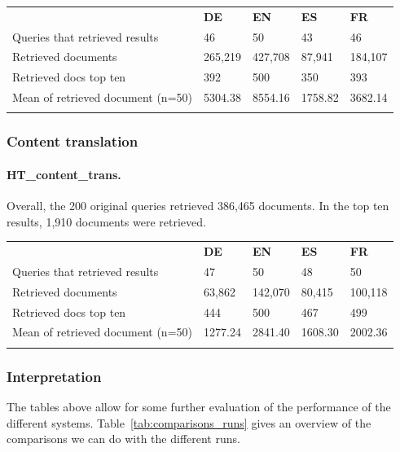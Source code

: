 \documentclass[a4paper,11pt]{article}
\begin{document}
\begin{table}[h]
\centering
\begin{tabularx}{0.81\textwidth}{lllll}
\cmidrule{1-5}
\addlinespace
& \textbf{DE} & \textbf{EN} & \textbf{ES} & \textbf{FR} \\
\addlinespace
\cmidrule{1-5}
\addlinespace
Queries that retrieved results & 46 & 50 & 43 & 46 \\
Retrieved documents & 265,219 & 427,708 & 87,941 & 184,107 \\
Retrieved docs top ten & 392 & 500 & 350 & 393 \\
Mean of retrieved document (n=50) & 5304.38 & 8554.16 & 1758.82 & 3682.14 \\
\addlinespace
\cmidrule{1-5}
\end{tabularx}
\label{result_list_analysis_8004}
\end{table}

\subsubsection{Content translation}
\paragraph{HT\_content\_trans.}
Overall, the 200 original queries retrieved 386,465 documents. In the top ten results, 1,910 documents were retrieved.

\begin{table}[!h]
\centering
\begin{tabularx}{0.81\textwidth}{lllll}
\cmidrule{1-5}
\addlinespace
& \textbf{DE} & \textbf{EN} & \textbf{ES} & \textbf{FR} \\
\addlinespace
\cmidrule{1-5}
\addlinespace
Queries that retrieved results & 47 & 50 & 48 & 50 \\
Retrieved documents & 63,862 & 142,070 & 80,415 & 100,118 \\
Retrieved docs top ten & 444 & 500 & 467 & 499 \\
Mean of retrieved document (n=50) & 1277.24 & 2841.40 & 1608.30 & 2002.36 \\
\addlinespace
\cmidrule{1-5}
\end{tabularx}
\label{result_list_analysis_8003}
\end{table}


\subsubsection{Interpretation}
The tables above allow for some further evaluation of the performance of the different systems. Table~\ref{tab:comparisons_runs} gives an overview of the comparisons we can do with the different runs.
\end{document}
